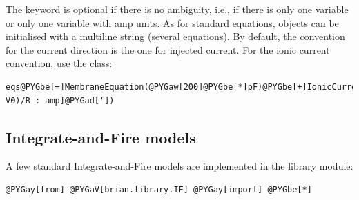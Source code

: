 \documentclass[letterpaper,10pt]{manual}
\begin{document}
The keyword  is optional if there is no ambiguity, i.e., if there is only one variable
or only one variable with amp units. As for standard equations,  objects can be initialised with
a multiline string (several equations). By default, the convention for the current direction is the one for injected
current. For the ionic current convention, use the  class:

\begin{Verbatim}[commandchars=@\[\]]
eqs@PYGbe[=]MembraneEquation(@PYGaw[200]@PYGbe[*]pF)@PYGbe[+]IonicCurrent(I@PYGbe[=]@PYGad[']@PYGad[(vm-V0)/R : amp]@PYGad['])
\end{Verbatim}


\subsection{Integrate-and-Fire models}

A few standard Integrate-and-Fire models are implemented in the  library module:

\begin{Verbatim}[commandchars=@\[\]]
@PYGay[from] @PYGaV[brian.library.IF] @PYGay[import] @PYGbe[*]
\end{Verbatim}
\end{document}
